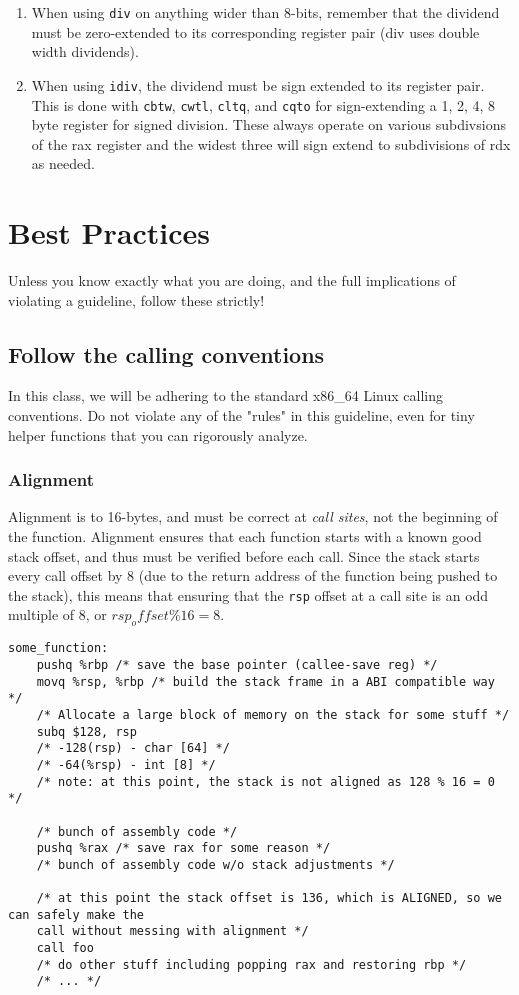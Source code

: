 \documentclass[11pt]{article}
\begin{document}
\begin{enumerate}
    \item When using \texttt{div} on anything wider than 8-bits, remember that the
        dividend must be zero-extended to its corresponding register pair (div uses
        double width dividends).

    \item When using \texttt{idiv}, the dividend must be sign extended to its register
        pair. This is done with \texttt{cbtw}, \texttt{cwtl}, \texttt{cltq}, and
        \texttt{cqto} for sign-extending a 1, 2, 4, 8 byte register for signed division.
        These always operate on various subdivsions of the rax register and the widest
        three will sign extend to subdivisions of rdx as needed.
\end{enumerate}


\section{Best Practices}

Unless you know exactly what you are doing, and the full implications of violating a
guideline, follow these strictly!

\subsection{Follow the calling conventions}

In this class, we will be adhering to the standard x86\_64 Linux calling conventions. Do
not violate any of the "rules" in this guideline, even for tiny helper functions that you
can rigorously analyze.

\subsubsection{Alignment} Alignment is to 16-bytes, and must be correct at \emph{call
sites}, not the beginning of the function. Alignment ensures that each function starts
with a known good stack offset, and thus must be verified before each call. Since the
stack starts every call offset by 8 (due to the return address of the function being
pushed to the stack), this means that ensuring that the \texttt{rsp} offset at a call site
is an odd multiple of 8, or $rsp_offset \% 16 = 8$.

\begin{lstlisting}
some_function:
    pushq %rbp /* save the base pointer (callee-save reg) */
    movq %rsp, %rbp /* build the stack frame in a ABI compatible way */
    /* Allocate a large block of memory on the stack for some stuff */
    subq $128, rsp
    /* -128(rsp) - char [64] */
    /* -64(%rsp) - int [8] */
    /* note: at this point, the stack is not aligned as 128 % 16 = 0 */

    /* bunch of assembly code */
    pushq %rax /* save rax for some reason */
    /* bunch of assembly code w/o stack adjustments */

    /* at this point the stack offset is 136, which is ALIGNED, so we can safely make the
    call without messing with alignment */
    call foo
    /* do other stuff including popping rax and restoring rbp */
    /* ... */
\end{lstlisting}
\end{document}
